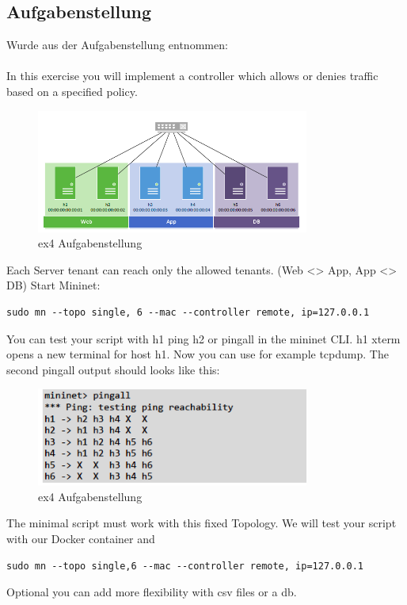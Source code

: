 \documentclass[a4,12pt]{scrartcl}
\begin{document}
\subsection{Aufgabenstellung}
Wurde aus der Aufgabenstellung entnommen: \\
\\
In this exercise you will implement a controller which allows or denies traffic based on a specified policy.
\begin{figure} [H]
	\begin{center}
	\includegraphics[width=0.80\textwidth]{./pictures/ex4_aufgabenstellung.png}
	\caption{ex4 Aufgabenstellung}
	\label{x}
	\end{center}
\end{figure} 
\noindent Each Server tenant can reach only the allowed tenants. (Web <> App, App <> DB)
Start Mininet: 
\begin{lstlisting}
sudo mn --topo single, 6 --mac --controller remote, ip=127.0.0.1
\end{lstlisting}
You can test your script with h1 ping h2 or pingall in the mininet CLI. h1 xterm opens a new
terminal for host h1. Now you can use for example tcpdump.
The second pingall output should looks like this:
\begin{figure} [H]
	\begin{center}
	\includegraphics[width=0.80\textwidth]{./pictures/ex4_aufgabenstellung2.png}
	\caption{ex4 Aufgabenstellung}
	\label{x}
	\end{center}
\end{figure} 
\newpage
\noindent The minimal script must work with this fixed Topology. We will test your script with our Docker
container and 
\begin{lstlisting}
sudo mn --topo single,6 --mac --controller remote, ip=127.0.0.1
\end{lstlisting}
Optional you can add more flexibility with csv files or a db.
\end{document}
